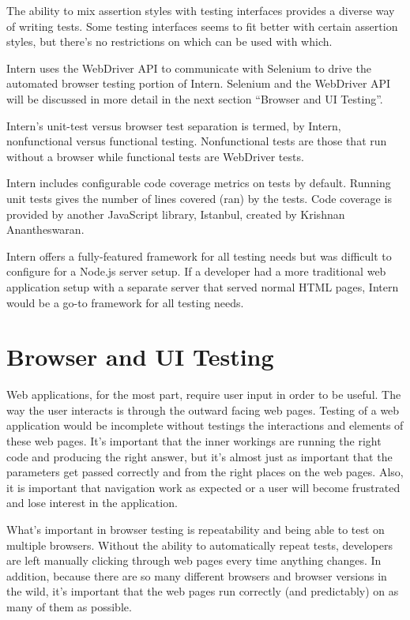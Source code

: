 \documentclass[12pt]{ucthesis}
\begin{document}
The ability to mix assertion styles with testing interfaces provides a diverse way of writing tests. Some testing interfaces seems to fit better with certain assertion styles, but there's no restrictions on which can be used with which.

Intern uses the WebDriver API to communicate with Selenium to drive the automated browser testing portion of Intern. Selenium and the WebDriver API will be discussed in more detail in the next section ``Browser and UI Testing''.

Intern's unit-test versus browser test separation is termed, by Intern, nonfunctional versus functional testing. Nonfunctional tests are those that run without a browser while functional tests are WebDriver tests.

Intern includes configurable code coverage metrics on tests by default. Running unit tests gives the number of lines covered (ran) by the tests. Code coverage is provided by another JavaScript library, Istanbul, created by Krishnan Anantheswaran\cite{Istanbul}.

Intern offers a fully-featured framework for all testing needs but was difficult to configure for a Node.js server setup. If a developer had a more traditional web application setup with a separate server that served normal HTML pages, Intern would be a go-to framework for all testing needs.

\section{Browser and UI Testing}
Web applications, for the most part, require user input in order to be useful. The way the user interacts is through the outward facing web pages. Testing of a web application would be incomplete without testings the interactions and elements of these web pages. It's important that the inner workings are running the right code and producing the right answer, but it's almost just as important that the parameters get passed correctly and from the right places on the web pages. Also, it is important that navigation work as expected or a user will become frustrated and lose interest in the application.

What's important in browser testing is repeatability and being able to test on multiple browsers. Without the ability to automatically repeat tests, developers are left manually clicking through web pages every time anything changes. In addition, because there are so many different browsers and browser versions in the wild, it's important that the web pages run correctly (and predictably) on as many of them as possible.
\end{document}
